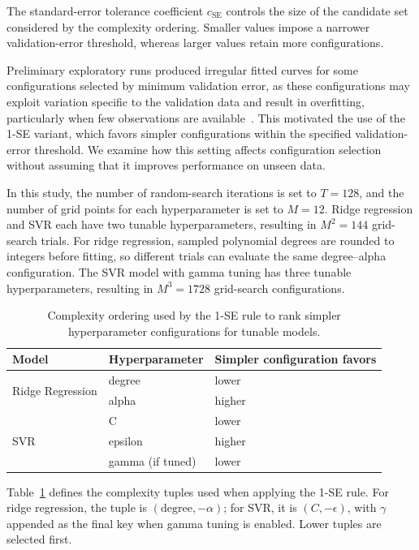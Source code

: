 The standard-error tolerance coefficient \(c_{\mathrm{SE}}\) controls the size of the candidate set considered by the complexity ordering.
Smaller values impose a narrower validation-error threshold, whereas larger values retain more configurations.

Preliminary exploratory runs produced irregular fitted curves for some configurations selected by minimum validation error, as these configurations may exploit variation specific to the validation data and result in overfitting, particularly when few observations are available~\cite{cawley2010over}. This motivated the use of the 1-SE variant, which favors simpler configurations within the specified validation-error threshold. We examine how this setting affects configuration selection without assuming that it improves performance on unseen data.

In this study, the number of random-search iterations is set to \(T = 128\), and the number of grid points for each hyperparameter is set to \(M = 12\).
Ridge regression and SVR each have two tunable hyperparameters, resulting in \(M^2 = 144\) grid-search trials.
For ridge regression, sampled polynomial degrees are rounded to integers before fitting, so different trials can evaluate the same degree–alpha configuration.
The SVR model with gamma tuning has three tunable hyperparameters, resulting in \(M^3 = 1728\) grid-search configurations.

\begin{table}[t]
	\centering
	\caption{
		\centering
		Complexity ordering used by the 1-SE rule to rank simpler hyperparameter configurations for tunable models.
	}
	\begin{tabular}{lll}
		\toprule
		Model & Hyperparameter   & Simpler configuration favors \\
		\midrule
		\multirow{2}{*}{Ridge Regression}
		      & degree           & lower                        \\
		      & alpha            & higher                       \\
		\midrule
		\multirow{3}{*}{SVR}
		      & C                & lower                        \\
		      & epsilon          & higher                       \\
		      & gamma (if tuned) & lower                        \\
		\bottomrule
	\end{tabular}
	\label{tab:complexity-ordering}
\end{table}

Table~\ref{tab:complexity-ordering} defines the complexity tuples used when applying the 1-SE rule. For ridge regression, the tuple is \((\mathrm{degree},-\alpha)\); for SVR, it is \((C,-\epsilon)\), with \(\gamma\) appended as the final key when gamma tuning is enabled. Lower tuples are selected first.
